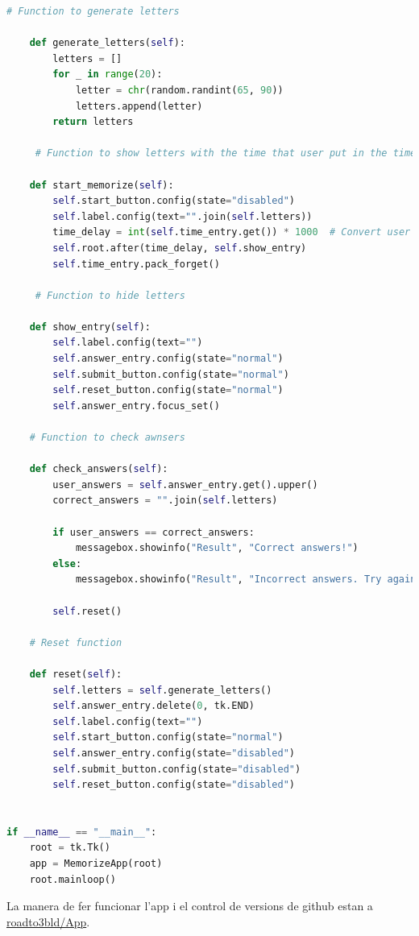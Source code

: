 \begin{lstlisting}[language=Python, style=colorEX, caption=Codi sencer de l'App]
     # Function to generate letters

    def generate_letters(self):
        letters = []
        for _ in range(20):
            letter = chr(random.randint(65, 90))
            letters.append(letter)
        return letters
    
     # Function to show letters with the time that user put in the time_entry textbox.

    def start_memorize(self):
        self.start_button.config(state="disabled")
        self.label.config(text="".join(self.letters))
        time_delay = int(self.time_entry.get()) * 1000  # Convert user seconds to milliseconds
        self.root.after(time_delay, self.show_entry)
        self.time_entry.pack_forget()  

     # Function to hide letters

    def show_entry(self):
        self.label.config(text="")
        self.answer_entry.config(state="normal")
        self.submit_button.config(state="normal")
        self.reset_button.config(state="normal")
        self.answer_entry.focus_set()

    # Function to check awnsers 

    def check_answers(self):
        user_answers = self.answer_entry.get().upper()
        correct_answers = "".join(self.letters)

        if user_answers == correct_answers:
            messagebox.showinfo("Result", "Correct answers!")
        else:
            messagebox.showinfo("Result", "Incorrect answers. Try again.")

        self.reset()

    # Reset function

    def reset(self):
        self.letters = self.generate_letters()
        self.answer_entry.delete(0, tk.END)
        self.label.config(text="")
        self.start_button.config(state="normal")
        self.answer_entry.config(state="disabled")
        self.submit_button.config(state="disabled")
        self.reset_button.config(state="disabled")
   

if __name__ == "__main__":
    root = tk.Tk()
    app = MemorizeApp(root)
    root.mainloop()

    \end{lstlisting}


La manera de fer funcionar l'app i el control de versions de github estan a \href{https://polsances13.github.io/roadto3bld/App.Html}{roadto3bld/App}.


\newpage
